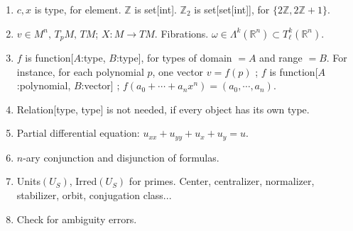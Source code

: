 \documentclass[11pt,a4paper]{article}
\newenvironment{myenum}
{ \begin{enumerate}
    \setlength{\itemsep}{0pt}
    \setlength{\parskip}{0pt}
    \setlength{\parsep}{0pt}     }
{ \end{enumerate}                  }
\begin{document}
\begin{myenum}
		$f = \lim$ function[$A$:interval, $B$:real] is function[$A$:interval, $C$:extended[real]].
		\item $c, x$ is type, for element. $\mathbb{Z}$ is set[int]. $\mathbb{Z}_2$ is set[set[int]], for $\{2\mathbb{Z}, 2\mathbb{Z} + 1 \}$.
		\item $v \in M^n,\,T_pM,\,TM$; $X: M \rightarrow TM$. Fibrations. $\omega \in \Lambda^k(\mathbb{R}^n) \subset T^k_\ell(\mathbb{R}^n)$.
		\item $f$ is function[$A$:type, $B$:type], for types of domain $=A$ and range $=B$. For instance, for each polynomial $p$, one vector $v = f(p)$ ; $f$ is function[$A$:polynomial, $B$:vector] ; $f(a_0 + \cdots + a_n x^n) = (a_0, \cdots, a_n)$.
		\item Relation[type, type] is not needed, if every object has its own type.
		\item Partial differential equation: $u_{xx} + u_{yy} + u_x + u_y = u$.
		\item $n$-ary conjunction and disjunction of formulas.
		\item Units$(U_S)$, Irred$(U_S)$ for primes. Center, centralizer, normalizer, stabilizer, orbit, conjugation class...
		\item Check for ambiguity errors.
		\end{myenum}
\end{document}
